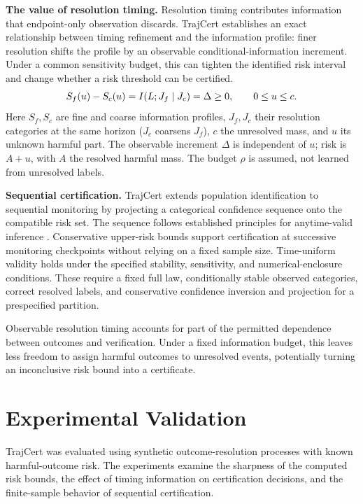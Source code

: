 \documentclass[a4paper,11pt]{article}
\begin{document}
\textbf{The value of resolution timing.}
Resolution timing contributes information that endpoint-only observation discards. TrajCert establishes an exact relationship between timing refinement and the information profile: finer resolution shifts the profile by an observable conditional-information increment. Under a common sensitivity budget, this can tighten the identified risk interval and change whether a risk threshold can be certified.
\[\setlength{\abovedisplayskip}{4pt}\setlength{\belowdisplayskip}{4pt}
 S_f(u)-S_c(u)=I(L;J_f\mid J_c)=\Delta\ge0,\qquad 0\le u\le c.
\]
Here $S_f,S_c$ are fine and coarse information profiles, $J_f,J_c$ their resolution categories at the same horizon ($J_c$ coarsens $J_f$), $c$ the unresolved mass, and $u$ its unknown harmful part. The observable increment $\Delta$ is independent of $u$; risk is $A+u$, with $A$ the resolved harmful mass. The budget $\rho$ is assumed, not learned from unresolved labels.

\textbf{Sequential certification.}
TrajCert extends population identification to sequential monitoring by projecting a categorical confidence sequence onto the compatible risk set. The sequence follows established principles for anytime-valid inference \cite{ramdas}. Conservative upper-risk bounds support certification at successive monitoring checkpoints without relying on a fixed sample size. Time-uniform validity holds under the specified stability, sensitivity, and numerical-enclosure conditions. These require a fixed full law, conditionally stable observed categories, correct resolved labels, and conservative confidence inversion and projection for a prespecified partition.

Observable resolution timing accounts for part of the permitted dependence between outcomes and verification. Under a fixed information budget, this leaves less freedom to assign harmful outcomes to unresolved events, potentially turning an inconclusive risk bound into a certificate.
\newpage
\section{Experimental Validation}
TrajCert was evaluated using synthetic outcome-resolution processes with known harmful-outcome risk. The experiments examine the sharpness of the computed risk bounds, the effect of timing information on certification decisions, and the finite-sample behavior of sequential certification.
\end{document}

